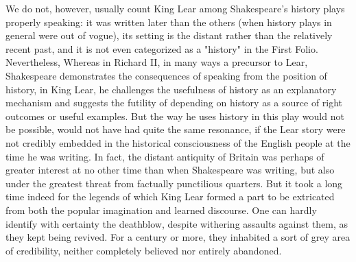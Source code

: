 	We do not, however, usually count King Lear among Shakespeare's history plays properly speaking: it was written later than the others (when history plays in general were out of vogue), its setting is the distant rather than the relatively recent past, and it is not even categorized as a "history" in the First Folio. Nevertheless, Whereas in Richard II, in many ways a precursor to Lear, Shakespeare demonstrates the consequences of speaking from the position of history, in King Lear, he challenges the usefulness of history as an explanatory mechanism and suggests the futility of depending on history as a source of right outcomes or useful examples. But the way he uses history in this play would not be possible, would not have had quite the same resonance, if the Lear story were not credibly embedded in the historical consciousness of the English people at the time he was writing. In fact, the distant antiquity of Britain was perhaps of greater interest at no other time than when Shakespeare was writing, but also under the greatest threat from factually punctilious quarters. But it took a long time indeed for the legends of which King Lear formed a part to be extricated from both the popular imagination and learned discourse. One can hardly identify with certainty the deathblow, despite withering assaults against them, as they kept being revived. For a century or more, they inhabited a sort of grey area of credibility, neither completely believed nor entirely abandoned.
